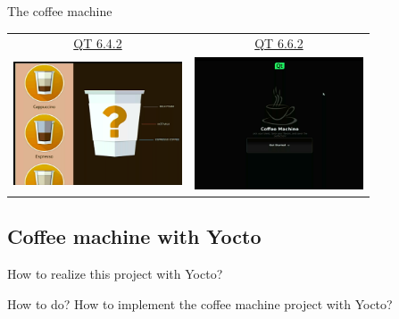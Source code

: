 \documentclass{beamer}
\begin{document}
\begin{frame}{The coffee machine}
	\begin{tabular}{cc}
		\href{https://github.com/qt/qtdoc/tree/v6.4.2/examples/demos/coffee}{QT 6.4.2} &
		\href{https://github.com/qt/qtdoc/tree/v6.6.2/examples/demos/coffee}{QT 6.6.2} \\
		\includegraphics[width=5cm]{assets/Screenshot_Coffee_QT6.4.2.png} &
		\includegraphics[width=5cm]{assets/Screenshot_Coffee_QT6.6.2.png} \\
	\end{tabular}
\end{frame}

\subsection{Coffee machine with Yocto}

\begin{frame}{How to realize this project with Yocto?}
	\begin{block}{How to do?}
		How to implement the coffee machine project with Yocto?
	\end{block}
\end{frame}
\end{document}
